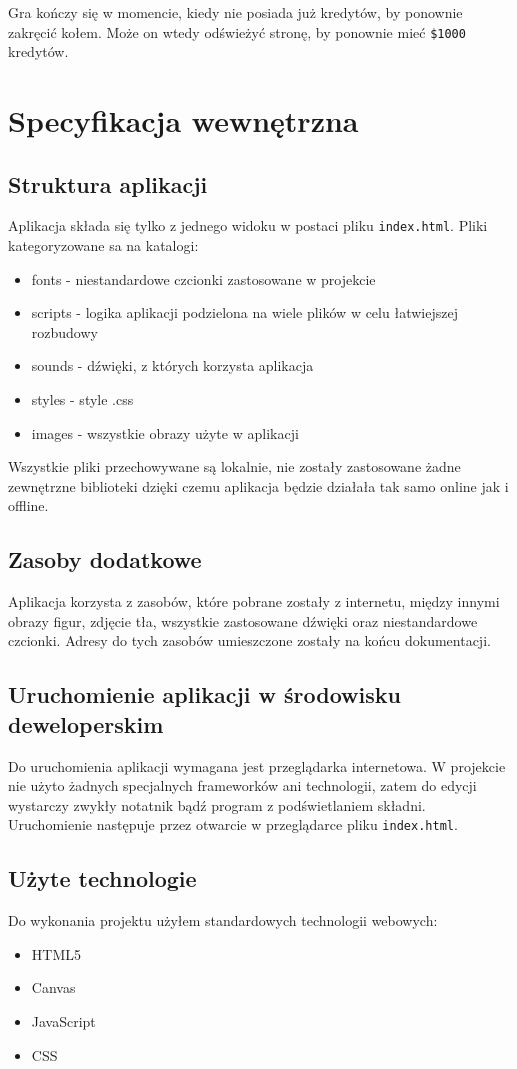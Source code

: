 \documentclass[a4paper,11pt,titlepage]{article}
\begin{document}
Gra kończy się w momencie, kiedy nie posiada już kredytów, by ponownie zakręcić kołem. Może on wtedy odświeżyć stronę, by ponownie mieć \verb|$1000| kredytów.

\section{Specyfikacja wewnętrzna}
\subsection{Struktura aplikacji}
Aplikacja składa się tylko z jednego widoku w postaci pliku \verb|index.html|. Pliki kategoryzowane sa na katalogi:
\begin{itemize}
	\item fonts - niestandardowe czcionki zastosowane w projekcie
	\item scripts - logika aplikacji podzielona na wiele plików w celu łatwiejszej rozbudowy
	\item sounds - dźwięki, z których korzysta aplikacja
	\item styles - style .css
	\item images - wszystkie obrazy użyte w aplikacji
\end{itemize}

Wszystkie pliki przechowywane są lokalnie, nie zostały zastosowane żadne zewnętrzne biblioteki dzięki czemu aplikacja będzie działała tak samo online jak i offline.

\subsection{Zasoby dodatkowe}
Aplikacja korzysta z zasobów, które pobrane zostały z internetu, między innymi obrazy figur, zdjęcie tła, wszystkie zastosowane dźwięki oraz niestandardowe czcionki. Adresy do tych zasobów umieszczone zostały na końcu dokumentacji.

\subsection{Uruchomienie aplikacji w środowisku deweloperskim}
Do uruchomienia aplikacji wymagana jest przeglądarka internetowa. W projekcie nie użyto żadnych specjalnych frameworków ani technologii, zatem do edycji wystarczy zwykły notatnik bądź program z podświetlaniem składni. Uruchomienie następuje przez otwarcie w przeglądarce pliku \verb|index.html|.

\subsection{Użyte technologie}
Do wykonania projektu użyłem standardowych technologii webowych:
\begin{itemize}
	\item HTML5
	\item Canvas
	\item JavaScript
	\item CSS
\end{itemize}
\end{document}
